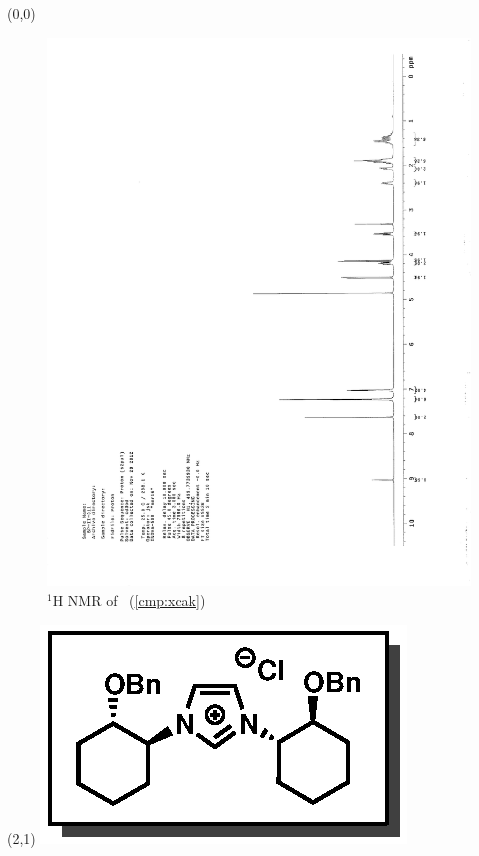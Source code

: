 \begin{textblock}{20}(0,0)
\begin{figure}[htb]
\caption{$^1$H NMR of \CMPxcak\ (\ref{cmp:xcak})}
\includegraphics[scale=0.75, trim = 0mm 0mm 0mm 5mm,
clip]{chp_alkylation/images/nmr/xcakH}
\vspace{-100pt}
\end{figure}
\end{textblock}
\begin{textblock}{1}(2,1)
\includegraphics[scale=0.8, angle=90]{chp_alkylation/images/xcak}
\end{textblock}
